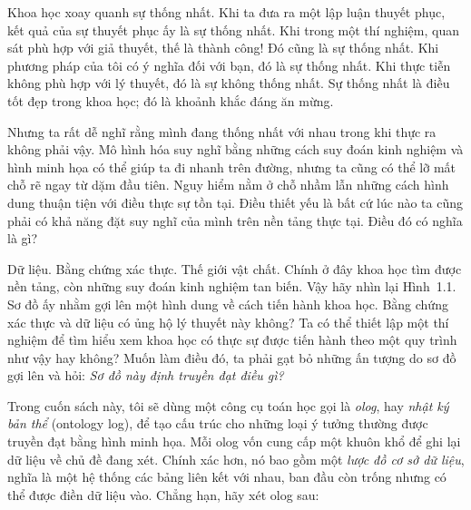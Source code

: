 Khoa học xoay quanh sự thống nhất. Khi ta đưa ra một lập luận thuyết phục, kết quả của sự thuyết phục ấy là sự thống nhất. Khi trong một thí nghiệm, quan sát phù hợp với giả thuyết, thế là thành công! Đó cũng là sự thống nhất. Khi phương pháp của tôi có ý nghĩa đối với bạn, đó là sự thống nhất. Khi thực tiễn không phù hợp với lý thuyết, đó là sự không thống nhất. Sự thống nhất là điều tốt đẹp trong khoa học; đó là khoảnh khắc đáng ăn mừng.

Nhưng ta rất dễ nghĩ rằng mình đang thống nhất với nhau trong khi thực ra không phải vậy. Mô hình hóa suy nghĩ bằng những cách suy đoán kinh nghiệm và hình minh họa có thể giúp ta đi nhanh trên đường, nhưng ta cũng có thể lỡ mất chỗ rẽ ngay từ dặm đầu tiên. Nguy hiểm nằm ở chỗ nhầm lẫn những cách hình dung thuận tiện với điều thực sự tồn tại. Điều thiết yếu là bất cứ lúc nào ta cũng phải có khả năng đặt suy nghĩ của mình trên nền tảng thực tại. Điều đó có nghĩa là gì?

Dữ liệu. Bằng chứng xác thực. Thế giới vật chất. Chính ở đây khoa học tìm được nền tảng, còn những suy đoán kinh nghiệm tan biến. Vậy hãy nhìn lại Hình~1.1. Sơ đồ ấy nhằm gợi lên một hình dung về cách tiến hành khoa học. Bằng chứng xác thực và dữ liệu có ủng hộ lý thuyết này không? Ta có thể thiết lập một thí nghiệm để tìm hiểu xem khoa học có thực sự được tiến hành theo một quy trình như vậy hay không? Muốn làm điều đó, ta phải gạt bỏ những ấn tượng do sơ đồ gợi lên và hỏi: \emph{Sơ đồ này định truyền đạt điều gì?}

Trong cuốn sách này, tôi sẽ dùng một công cụ toán học gọi là \emph{olog}, hay \emph{nhật ký bản thể} (ontology log), để tạo cấu trúc cho những loại ý tưởng thường được truyền đạt bằng hình minh họa. Mỗi olog vốn cung cấp một khuôn khổ để ghi lại dữ liệu về chủ đề đang xét. Chính xác hơn, nó bao gồm một \emph{lược đồ cơ sở dữ liệu}, nghĩa là một hệ thống các bảng liên kết với nhau, ban đầu còn trống nhưng có thể được điền dữ liệu vào. Chẳng hạn, hãy xét olog sau:

\begin{center}
\end{center}

